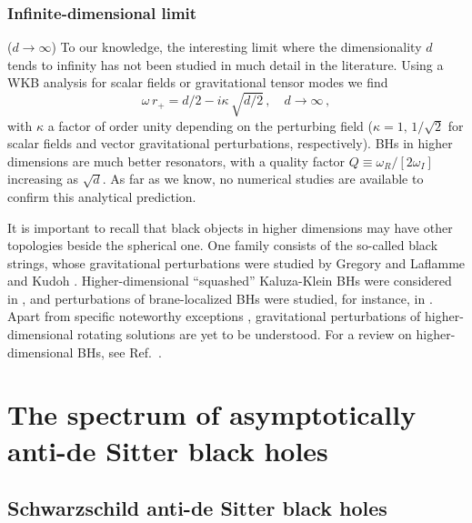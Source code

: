 \documentclass[]{iopart}
\def\be{\begin{equation}}
\def\ee{\end{equation}}
\begin{document}
\subsubsection*{Infinite-dimensional limit} ($d \rightarrow \infty$) 
To our knowledge, the interesting limit where the dimensionality $d$ tends to
infinity has not been studied in much detail in the literature.  Using a WKB
analysis for scalar fields or gravitational tensor modes we find
%
\be
\omega \,r_+=d/2-i \kappa\,\sqrt{d/2}\,,\quad
d\rightarrow \infty\,,
\ee
%
with $\kappa$ a factor of order unity depending on the perturbing field
($\kappa=1,\,1/\sqrt{2}$ for scalar fields and vector gravitational
perturbations, respectively). BHs in higher dimensions are much better
resonators, with a quality factor $Q\equiv \omega_R/[2\omega_I]$ increasing as
$\sqrt{d}$. As far as we know, no numerical studies are available to confirm
this analytical prediction.

It is important to recall that black objects in higher dimensions may have
other topologies beside the spherical one. One family consists of the
so-called black strings, whose gravitational perturbations were studied by
Gregory and Laflamme \cite{Gregory:1993vy,Gregory:1994bj} and Kudoh
\cite{Kudoh:2006bp}. Higher-dimensional ``squashed'' Kaluza-Klein BHs were
considered in \cite{Ishihara:2008re}, and perturbations of brane-localized BHs
were studied, for instance, in
\cite{Kanti:2004nr,Ida:2002ez,Seahra:2004fg}. Apart from specific noteworthy
exceptions \cite{Kunduri:2006qa,Murata:2007gv,Kodama:2009rq,Kodama:2009bf},
gravitational perturbations of higher-dimensional rotating solutions are yet
to be understood. For a review on higher-dimensional BHs, see
Ref.~\cite{Emparan:2008eg}.

\section{\label{sec:asAdS}The spectrum of asymptotically anti-de Sitter black holes}

\subsection{\label{sec:sads}Schwarzschild anti-de Sitter black holes}
\end{document}
